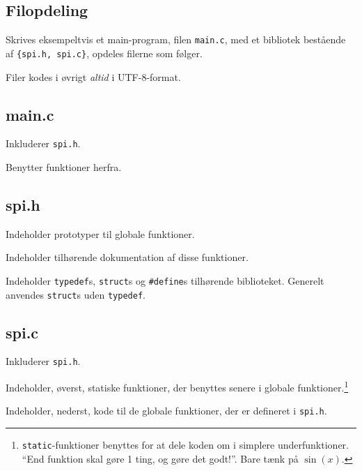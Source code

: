 \documentclass[article, 10pt]{memoir}
\let\tempone\itemize
\let\temptwo\enditemize
\renewenvironment{itemize}{\tempone\firmlist}{\temptwo}
\begin{document}
\begin{multicols}{2}
    \chapter{Filopdeling}
    Skrives eksempeltvis et main-program, filen \texttt{main.c}, med et bibliotek bestående af \texttt{\{spi.h, spi.c\}}, opdeles filerne som følger. 

    Filer kodes i øvrigt \emph{altid} i UTF-8-format.

    \section{main.c}
    \begin{itemize}
        \item Inkluderer \texttt{spi.h}.
        \item Benytter funktioner herfra.
    \end{itemize}

    \section{spi.h}
    \begin{itemize}
        \item Indeholder prototyper til globale funktioner.
        \item Indeholder tilhørende dokumentation af disse funktioner.
        \item Indeholder \texttt{typedef}s, \texttt{struct}s og \texttt{\#define}s tilhørende biblioteket. Generelt anvendes \texttt{struct}s uden \texttt{typedef}.
    \end{itemize}

    \section{spi.c}
    \begin{itemize}
        \item Inkluderer \texttt{spi.h}.
        \item Indeholder, øverst, statiske funktioner, der benyttes senere i globale funktioner.\footnote{\texttt{static}-funktioner benyttes for at dele koden om i simplere underfunktioner. ``End funktion skal gøre 1 ting, og gøre det godt!''. Bare tænk på $\sin(x)$.}
        \item Indeholder, nederst, kode til de globale funktioner, der er defineret i \texttt{spi.h}.
    \end{itemize}
\end{multicols}
\end{document}
